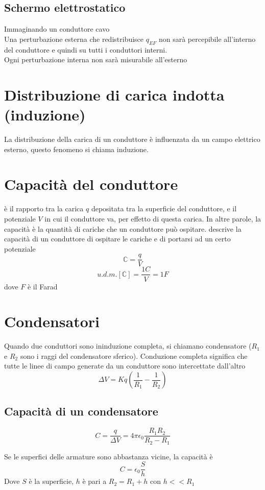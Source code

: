 \documentclass[a4paper]{report}
\begin{document}
  \subsection{Schermo elettrostatico}
  Immaginando un conduttore cavo\\
  Una perturbazione esterna che redistribuisce $q_{EF}$ non sarà percepibile all'interno del conduttore e quindi su tutti i conduttori interni.\\
  Ogni perturbazione interna non sarà misurabile all'esterno

  \section{Distribuzione di carica indotta (induzione)}
  La distribuzione della carica di un conduttore è influenzata da un campo elettrico esterno, questo fenomeno si chiama induzione.

  \section{Capacità del conduttore}
  è il rapporto tra la carica $q$ depositata tra la superficie del conduttore, e il potenziale $V$ in cui il conduttore va, per effetto di questa carica. In altre parole, la capacità è la quantità di cariche che un conduttore può ospitare. descrive la capacità di un conduttore di ospitare le cariche e di portarsi ad un certo potenziale
  $$ \mathbb{C} = \frac{q}{V} $$
  $$u.d.m.[\mathbb{C}] = \frac{1C}{V} = 1F$$
  dove $ F $ è il Farad

  \section{Condensatori}
  Quando due conduttori sono ininduzione completa, si chiamano condensatore ($R_1$ e $R_2$ sono i raggi del condensatore sferico). Conduzione completa significa che tutte le linee di campo generate da un conduttore sono intercettate dall'altro
  $$ \Delta V = Kq (\frac{1}{R_1} - \frac{1}{R_2}) $$

  \subsection{Capacità di un condensatore}
  $$ C= \frac{q}{\Delta V} = 4 \pi \epsilon_0 \frac{R_1 R_2}{R_2 - R_1} $$

  Se le superfici delle armature sono abbastanza vicine, la capacità è
  $$C = \epsilon_0 \frac{S}{h}$$
  Dove $S$ è la superficie, $h$ è pari a $R_2 = R_1 + h$ con $h<<R_1$
\end{document}
